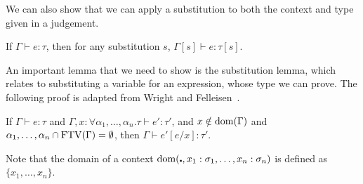 We can also show that we can apply a substitution to both the context
and type given in a judgement.
\begin{lemma} \label{lem:subContextTyping}
  If $\Gamma \vdash e : \tau$, then for any substitution $s$, $\Gamma[s] \vdash e : \tau[s]$.
\end{lemma}

An important lemma that we need to show is the substitution
lemma, which relates to substituting a variable for an expression,
whose type we can prove. The following proof is adapted from Wright
and Felleisen~\cite{wright1994}.

\begin{lemma}[Substitution] \label{lem:substitution}
  If $\Gamma \vdash e : \tau$ and ${\Gamma , x : \forall \alpha_1, \ldots, \alpha_n . \tau \vdash e' : \tau'}$, and ${x \notin \operatorname{dom}(\Gamma)}$ and
  ${\alpha_1 , \ldots, \alpha_n \cap \operatorname{FTV}(\Gamma) = \emptyset}$, then ${\Gamma \vdash e' [e/x] : \tau'}$.
\end{lemma}
Note that the domain of a context $\operatorname{dom}(\centerdot , x_1 : \sigma_1 , \ldots , x_n :
\sigma_n)$ is defined as $\{ x_1 , \ldots , x_n \}$.
